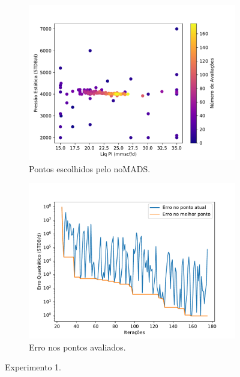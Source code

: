 \begin{figure}
\centering
\begin{subfigure}{0.5\textwidth}
  \centering
  \includegraphics[width=1\linewidth]{figs/setup1_eval_points.pdf}
  \caption{Pontos escolhidos pelo noMADS.}
  \label{fig:setup1_points}
\end{subfigure}%
\begin{subfigure}{0.5\textwidth}
  \centering
  \includegraphics[width=1\linewidth]{figs/setup1_errors.pdf}
  \caption{Erro nos pontos avaliados.}
  \label{fig:setup1_error}
\end{subfigure}
\caption{Experimento 1.}
\label{fig:setup1_2}
\end{figure}

